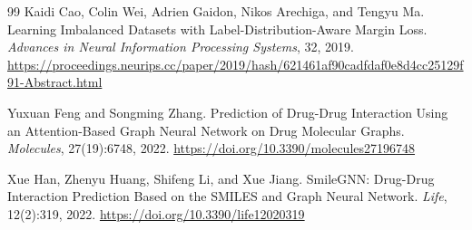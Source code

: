 \documentclass[12pt,a4paper]{report}
\begin{document}
\begin{thebibliography}{99}
Kaidi Cao, Colin Wei, Adrien Gaidon, Nikos Arechiga, and Tengyu Ma.
\newblock Learning Imbalanced Datasets with Label-Distribution-Aware Margin Loss.
\newblock \emph{Advances in Neural Information Processing Systems}, 32, 2019.
\newblock \url{https://proceedings.neurips.cc/paper/2019/hash/621461af90cadfdaf0e8d4cc25129f91-Abstract.html}

Yuxuan Feng and Songming Zhang.
\newblock Prediction of Drug-Drug Interaction Using an Attention-Based Graph Neural Network on Drug Molecular Graphs.
\newblock \emph{Molecules}, 27(19):6748, 2022.
\newblock \url{https://doi.org/10.3390/molecules27196748}

Xue Han, Zhenyu Huang, Shifeng Li, and Xue Jiang.
\newblock SmileGNN: Drug-Drug Interaction Prediction Based on the SMILES and Graph Neural Network.
\newblock \emph{Life}, 12(2):319, 2022.
\newblock \url{https://doi.org/10.3390/life12020319}

\end{thebibliography}
\end{document}
